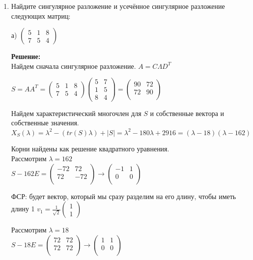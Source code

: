 \documentclass[a4paper,12pt]{article}
\begin{document}
\begin{enumerate}
\item Найдите сингулярное разложение и усечённое сингулярное разложение следующих матриц:

\vspace{5pt}


а)
$
\begin{pmatrix}
{5}&{1}&{8}\\
{7}&{5}&{4}
\end{pmatrix}
$

\vspace{5pt}
\textbf{Решение:}\\
Найдем сначала сингулярное разложение.
$A = C \Lambda D^T$


$S=AA^T=\begin{pmatrix}
5&1&8\\
7&5&4
\end{pmatrix}\begin{pmatrix}
5&7\\
1&5\\
8&4
\end{pmatrix} = \begin{pmatrix}
90&72\\
72&90\\
\end{pmatrix}$

Найдем характеристический многочлен для $S$ и собственные вектора и собственные значения.
$X_S(\lambda) = \lambda^2-(tr(S)\lambda)+|S|=\lambda^2-180\lambda+2916 = (\lambda-18)(\lambda-162)$

Корни найдены как решение квадратного уравнения.\\
Рассмотрим $\lambda=162$\\
$S-162E=\begin{pmatrix}
-72&72\\
72&-72\\
\end{pmatrix} \rightarrow\begin{pmatrix}
-1&1\\
0&0\\
\end{pmatrix} $

ФСР: будет вектор, который мы сразу разделим на его длину, чтобы иметь длину 1 $v_1 = \frac{1}{\sqrt{2}}\begin{pmatrix}
1\\
1
\end{pmatrix}$

Рассмотрим $\lambda=18$\\
$S-18E=\begin{pmatrix}
72&72\\
72&72\\
\end{pmatrix} \rightarrow\begin{pmatrix}
1&1\\
0&0\\
\end{pmatrix}$


\end{enumerate}
\end{document}

